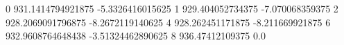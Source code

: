 0 931.1414794921875 -5.3326416015625
1 929.404052734375 -7.070068359375
2 928.2069091796875 -8.2672119140625
4 928.262451171875 -8.211669921875
6 932.9608764648438 -3.51324462890625
8 936.47412109375 0.0
